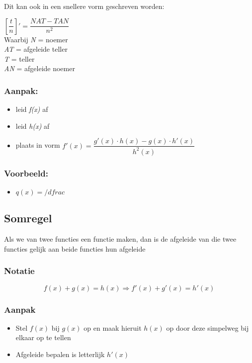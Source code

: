 \documentclass[11pt]{article}
\begin{document}
Dit kan ook in een snellere vorm geschreven worden:

\([\dfrac{t}{n}]' = \dfrac{NAT-TAN}{n^{2}}\) \\
Waarbij \textit{N} = noemer \\
\textit{AT} = afgeleide teller \\
\textit{T} = teller \\
\textit{AN} = afgeleide noemer

\subsubsection{Aanpak:}
\label{sec:org580d092}
\begin{itemize}
\item leid \textit{f(x)} af
\item leid \textit{h(x)} af
\item plaats in vorm  \(f'(x) = \dfrac{g'(x) \cdot h(x) - g(x) \cdot h'(x)}{h^{2}(x)}\)
\end{itemize}

\subsubsection{Voorbeeld:}
\label{sec:orgf136f1f}
\begin{itemize}
\item \(q(x) = /dfrac{}{}\)
\end{itemize}



\subsection{Somregel}
\label{sec:orgf68f9f1}
Als we van twee functies een functie maken, dan is de afgeleide van die twee functies gelijk aan beide functies hun afgeleide
\subsubsection{Notatie}
\label{sec:orgaf68e53}
\begin{equation}
f(x) + g(x) = h(x) \Rightarrow f'(x) + g'(x) = h'(x)
\end{equation}
\subsubsection{Aanpak}
\label{sec:org477117b}
\begin{itemize}
\item Stel \(f(x)\) bij \(g(x)\) op en maak hieruit \(h(x)\) op door deze simpelweg bij elkaar op te tellen
\item Afgeleide bepalen is letterlijk \(h'(x)\)
\end{itemize}
\end{document}
